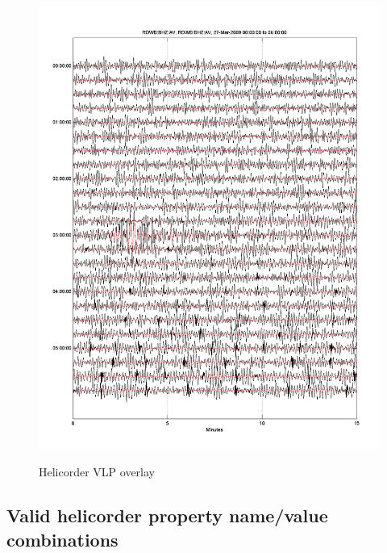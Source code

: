 \documentclass[11pt]{article}
\begin{document}
\begin{figure}[ht] 
\centerline{\scalebox{.6} {\includegraphics{hel_stack_2.png}}} 
\caption{Helicorder VLP overlay} 
\label{hel_stack_2}
\end{figure}

\clearpage

\subsection{Valid helicorder property name/value combinations}
\end{document}
